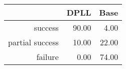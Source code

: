 \begin{table}[ht]
\centering
\begin{tabular}{rrr}
  \hline
 & DPLL & Base \\ 
  \hline
success & 90.00 & 4.00 \\ 
  partial success & 10.00 & 22.00 \\ 
  failure & 0.00 & 74.00 \\ 
   \hline
\end{tabular}
\end{table}
